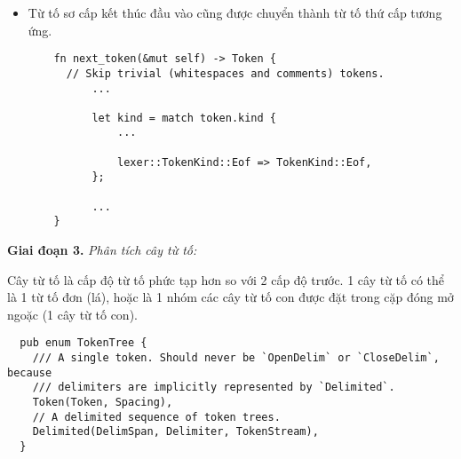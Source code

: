\begin{itemize}
\begin{lstlisting}
          ...
    }
  \end{lstlisting}
  \item Từ tố sơ cấp kết thúc đầu vào cũng được chuyển thành từ tố thứ cấp tương ứng.
  \begin{lstlisting}
    fn next_token(&mut self) -> Token {
      // Skip trivial (whitespaces and comments) tokens.
          ...
  
          let kind = match token.kind {
              ...    
  
              lexer::TokenKind::Eof => TokenKind::Eof,
          };
  
          ...
    }
  \end{lstlisting}
\end{itemize}

\textbf{Giai đoạn 3.} \textit{Phân tích cây từ tố:}

Cây từ tố là cấp độ từ tố phức tạp hơn so với 2 cấp độ trước. 1 cây từ tố có thể là 1 từ tố đơn (lá), hoặc là 1 nhóm các cây từ tố con được đặt trong cặp đóng mở ngoặc (1 cây từ tố con).

\begin{lstlisting}
  pub enum TokenTree {
    /// A single token. Should never be `OpenDelim` or `CloseDelim`, because
    /// delimiters are implicitly represented by `Delimited`.
    Token(Token, Spacing),
    // A delimited sequence of token trees.
    Delimited(DelimSpan, Delimiter, TokenStream),
  }
\end{lstlisting}

